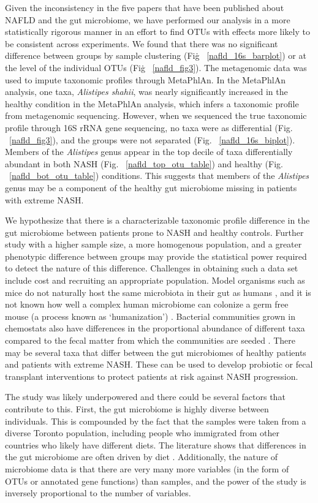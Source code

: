 Given the inconsistency in the five papers that have been published about NAFLD and the gut microbiome, we have performed our analysis in a more statistically rigorous manner in an effort to find OTUs with effects more likely to be consistent across experiments. We found that there was no significant difference between groups by sample clustering (Fig\. ~\ref{nafld_16s_barplot}) or at the level of the individual OTUs (Fig\. ~\ref{nafld_fig3}). The metagenomic data was used to impute taxonomic profiles through MetaPhlAn. In the MetaPhlAn analysis, one taxa, \textit{Alistipes shahii}, was nearly significantly increased in the healthy condition in the MetaPhlAn analysis, which infers a taxonomic profile from metagenomic sequencing. However, when we sequenced the true taxonomic profile through 16S rRNA gene sequencing, no taxa were as differential (Fig. ~\ref{nafld_fig3}), and the groups were not separated (Fig. ~\ref{nafld_16s_biplot}). Members of the \textit{Alistipes} genus appear in the top decile of taxa differentially abundant in both NASH (Fig. ~\ref{nafld_top_otu_table}) and healthy (Fig. ~\ref{nafld_bot_otu_table}) conditions. This suggests that members of the \textit{Alistipes} genus may be a component of the healthy gut microbiome missing in patients with extreme NASH.

We hypothesize that there is a characterizable taxonomic profile difference in the gut microbiome between patients prone to NASH and healthy controls. Further study with a higher sample size, a more homogenous population, and a greater phenotypic difference between groups may provide the statistical power required to detect the nature of this difference. Challenges in obtaining such a data set include cost and recruiting an appropriate population. Model organisms such as mice do not naturally host the same microbiota in their gut as humans \cite{nguyen2015informative}, and it is not known how well a complex human microbiome can colonize a germ free mouse (a process known as `humanization') \cite{clavel2016mouse}. Bacterial communities grown in chemostats also have differences in the proportional abundance of different taxa compared to the fecal matter from which the communities are seeded \cite{mcdonald2013evaluation}. There may be several taxa that differ between the gut microbiomes of healthy patients and patients with extreme NASH. These can be used to develop probiotic or fecal transplant interventions to protect patients at risk against NASH progression.

The study was likely underpowered and there could be several factors that contribute to this. First, the gut microbiome is highly diverse between individuals. This is compounded by the fact that the samples were taken from a diverse Toronto population, including people who immigrated from other countries who likely have different diets. The literature shows that differences in the gut microbiome are often driven by diet \cite{david2014diet}. Additionally, the nature of microbiome data is that there are very many more variables (in the form of OTUs or annotated gene functions) than samples, and the power of the study is inversely proportional to the number of variables.

